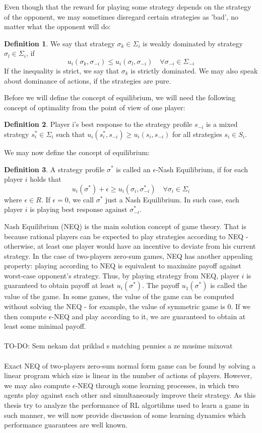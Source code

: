 \documentclass{article}
\theoremstyle{remark}
\theoremstyle{definition}
\newtheorem{definition}{Definition}[section]
\begin{document}
Even though that the reward for playing some strategy depends on the strategy of the opponent, we may sometimes disregard certain strategies as 'bad', no matter what the opponent will do:
\begin{definition}
	We say that strategy $\sigma_k \in \Sigma_i$ is weakly dominated by strategy $\sigma_l \in \Sigma_i$, if
	$$
	u_i(\sigma_k, \sigma_{-i}) \leq u_i(\sigma_l, \sigma_{-i}) \quad \forall \sigma_{-i} \in \Sigma_{-i}
	$$
	If the inequality is strict, we say that $\sigma_k$ is strictly dominated. We may also speak about dominance of actions, if the strategies are pure.
\end{definition}

Before we will define the concept of equilibrium, we will need the following concept of optimality from the point of view of one player:
\begin{definition}
	Player i's best response to the strategy profile $s_{-i}$ is a mixed strategy $s_i^* \in \Sigma_i$ such that $u_i(s_i^*, s_{-i}) \geq u_i(s_i, s_{-i})$ for all strategies $s_i \in S_i$.
\end{definition}

We may now define the concept of equilibrium:
\begin{definition}
	A strategy profile $\sigma^*$ is called an $\epsilon$-Nash Equilibrium, if for each player $i$ holds that
	$$
	u_i(\sigma^*) + \epsilon \geq u_i(\sigma_i, \sigma_{-i}^*) \quad \forall \sigma_i \in \Sigma_i
	$$
	where $\epsilon \in R$. If $\epsilon = 0$, we call $\sigma^*$ just a Nash Equilibrium. In such case, each player $i$ is playing best response against $\sigma^*_{-i}$.
\end{definition}
Nash Equilibrium (NEQ) is the main solution concept of game theory. That is because rational players can be expected to play strategies according to NEQ - otherwise, at least one player would have an incentive to deviate from his current strategy. In the case of two-players zero-sum games, NEQ has another appealing property: playing according to NEQ is equivalent to maximize payoff against worst-case opponent's strategy. Thus, by playing strategy from NEQ, player $i$ is guaranteed to obtain payoff at least $u_i(\sigma^*)$. The payoff $u_1(\sigma^*)$ is called the value of the game. In some games, the value of the game can be computed without solving the NEQ - for example, the value of symmetric game is 0. If we then compute $\epsilon$-NEQ and play according to it, we are guaranteed to obtain at least some minimal payoff. \\
\\TO-DO: Sem nekam dat priklad s matching pennies a ze musime mixovat \\ \\
Exact NEQ of two-players zero-sum normal form game can be found by solving a linear program which size is linear in the number of actions of players. However, we may also compute $\epsilon$-NEQ through some learning processes, in which two agents play against each other and simultaneously improve their strategy. As this thesis try to analyze the performance of RL algortihms used to learn a game in such manner, we will now provide discussion of some learning dynamics which performance guarantees are well known. 
\end{document}
